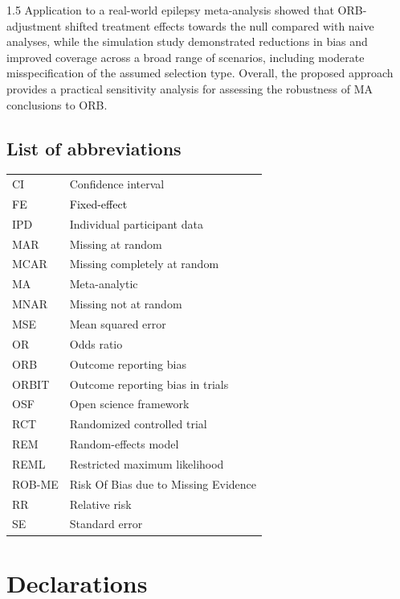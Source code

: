 \documentclass{article}
\newcommand{\mycolor}[1]{\textcolor{black}{#1}}
\begin{document}
\begin{spacing}{1.5}
Application to a real-world epilepsy meta-analysis showed that ORB-adjustment shifted treatment effects towards the null compared with naive analyses, while the simulation study demonstrated reductions in bias and improved coverage across a broad range of scenarios, including moderate misspecification of the assumed selection type. Overall, the proposed approach provides a practical sensitivity analysis for assessing the robustness of MA conclusions to ORB.

\subsection*{List of abbreviations}

\begin{table}[H]
\begin{tabular}{ll}
CI    & Confidence interval              \\
\mycolor{FE}    & \mycolor{Fixed-effect}\\
IPD   & Individual participant data      \\
MAR   & Missing at random                \\
MCAR  & Missing completely at random     \\
MA    & Meta-analytic                    \\
MNAR  & Missing not at random            \\
MSE   & Mean squared error               \\
OR    & Odds ratio                       \\
ORB   & Outcome reporting bias           \\
ORBIT & Outcome reporting bias in trials \\
OSF   & Open science framework           \\
RCT   & Randomized controlled trial      \\
REM   & Random-effects model             \\
REML & Restricted maximum likelihood     \\
ROB-ME & Risk Of Bias due to Missing Evidence \\
RR    & Relative risk                    \\
SE    & Standard error                  
\end{tabular}
\end{table}

\section*{Declarations}


\end{spacing}
\end{document}

